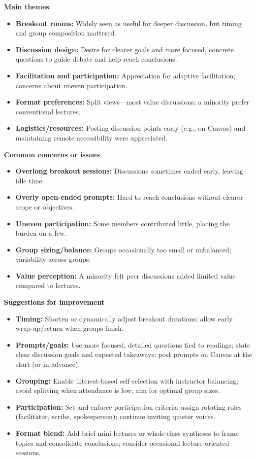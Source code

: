 \documentclass[a4paper]{report}
\begin{document}
\textbf{Main themes}
\begin{itemize}
\item \textbf{Breakout rooms:} Widely seen as useful for deeper discussion, but timing and group composition mattered.
\item \textbf{Discussion design:} Desire for clearer goals and more focused, concrete questions to guide debate and help reach conclusions.
\item \textbf{Facilitation and participation:} Appreciation for adaptive facilitation; concerns about uneven participation.
\item \textbf{Format preferences:} Split views—most value discussions; a minority prefer conventional lectures.
\item \textbf{Logistics/resources:} Posting discussion points early (e.g., on Canvas) and maintaining remote accessibility were appreciated.
\end{itemize}

\textbf{Common concerns or issues}
\begin{itemize}
\item \textbf{Overlong breakout sessions:} Discussions sometimes ended early, leaving idle time.
\item \textbf{Overly open-ended prompts:} Hard to reach conclusions without clearer scope or objectives.
\item \textbf{Uneven participation:} Some members contributed little, placing the burden on a few.
\item \textbf{Group sizing/balance:} Groups occasionally too small or unbalanced; variability across groups.
\item \textbf{Value perception:} A minority felt peer discussions added limited value compared to lectures.
\end{itemize}

\textbf{Suggestions for improvement}
\begin{itemize}
\item \textbf{Timing:} Shorten or dynamically adjust breakout durations; allow early wrap-up/return when groups finish.
\item \textbf{Prompts/goals:} Use more focused, detailed questions tied to readings; state clear discussion goals and expected takeaways; post prompts on Canvas at the start (or in advance).
\item \textbf{Grouping:} Enable interest-based self-selection with instructor balancing; avoid splitting when attendance is low; aim for optimal group sizes.
\item \textbf{Participation:} Set and enforce participation criteria; assign rotating roles (facilitator, scribe, spokesperson); continue inviting quieter voices.
\item \textbf{Format blend:} Add brief mini-lectures or whole-class syntheses to frame topics and consolidate conclusions; consider occasional lecture-oriented sessions.
\end{itemize}
\end{document}

